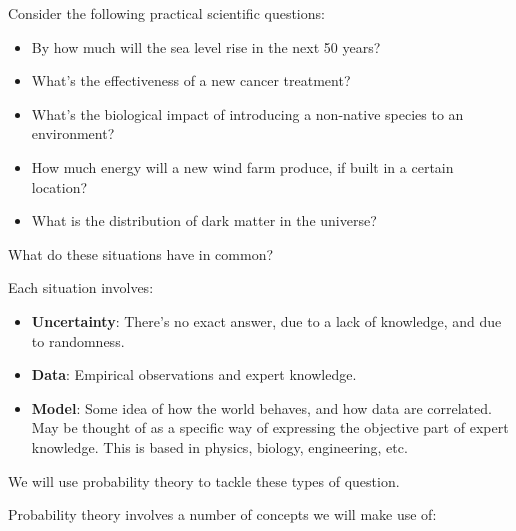 \documentclass[a4paper]{article}
\begin{document}
            Consider the following practical scientific questions:

            \begin{itemize}
                \item By how much will the sea level rise in the next 50 years?
                \item What's the effectiveness of a new cancer treatment?
                \item What's the biological impact of introducing a non-native
                    species to an environment?
                \item How much energy will a new wind farm produce, if built in
                    a certain location?
                \item What is the distribution of dark matter in the universe?
            \end{itemize}

            What do these situations have in common?

            \begin{definition}
                Each situation involves:

                \begin{itemize}
                    \item \textbf{Uncertainty}: There's no exact answer, due to
                        a lack of knowledge, and due to randomness.
                    \item \textbf{Data}: Empirical observations and expert
                        knowledge.
                    \item \textbf{Model}: Some idea of how the world behaves,
                        and how data are correlated. May be thought of as a
                        specific way of expressing the objective part of expert
                        knowledge. This is based in physics, biology,
                        engineering, etc.
                \end{itemize}
            \end{definition}

            We will use probability theory to tackle these types of question.

            Probability theory involves a number of concepts we will make use
            of:
\end{document}
